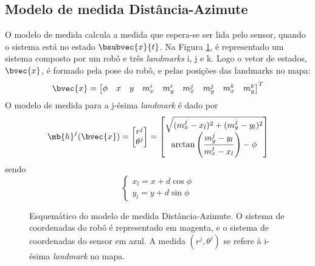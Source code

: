 \subsection{Modelo de medida Distância-Azimute}
O modelo de medida calcula a medida que espera-se ser lida pelo sensor, quando o sistema está no estado $\bsubvec{x}{t}$. Na Figura \ref{fig:range-bearing-measurement-schematic}, é representado um sistema composto por um robô e três \textit{landmarks} i, j e k. Logo o vetor de estados, $\bvec{x}$, é formado pela pose do robô, e pelas posições das landmarks no mapa:
\begin{equation}
  \bvec{x} = \begin{bmatrix}
    \phi & x & y & m_x^i & m_y^i & m_x^j & m_y^j & m_x^k & m_y^k
  \end{bmatrix}^T
\end{equation}
O modelo de medida para a j-ésima \textit{landmark} é dado por
\renewcommand{\arraystretch}{1.5}
\begin{equation}
  \mb{h}^j(\bvec{x}) = \begin{bmatrix}
    r^j \\ \theta^j
  \end{bmatrix} = \begin{bmatrix}
    \sqrt{(m_x^j - x_l)^2 + (m_y^j - y_l)^2} \\
    \arctan\left(\dfrac{m_y^j - y_l}{m_x^j - x_l}\right) - \phi
  \end{bmatrix}
  \label{eq:range-bearing-measurement-model}
\end{equation}
\renewcommand{\arraystretch}{1}
sendo
\begin{equation}
  \begin{cases}
    x_l = x + d \cos \phi\\
    y_l = y + d \sin \phi
  \end{cases}
\end{equation}

\begin{figure}[h]
  \centering
  
  \caption[Esquemático do modelo de medida Distância-Azimute]{Esquemático do modelo de medida Distância-Azimute. O sistema de coordenadas do robô é representado em magenta, e o sistema de coordenadas do sensor em azul. A medida $(r^j, \theta^j)$ se refere à i-ésima \textit{landmark} no mapa.}
  \label{fig:range-bearing-measurement-schematic}
\end{figure}

